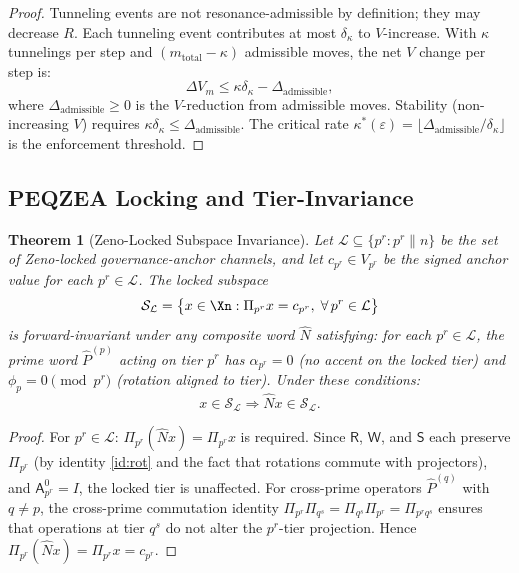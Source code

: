 \documentclass[11pt]{amsart}
\newtheorem{theorem}{Theorem}[section]
\newcommand{\Prj}{\Pi}
\newcommand{\Sp}{\mathsf{S}}
\newcommand{\Ap}{\mathsf{A}}
\newcommand{\Rp}{\mathsf{R}}
\newcommand{\Wp}{\mathsf{W}}
\newcommand{\bN}{\widehat{N}}
\begin{document}
\begin{proof}
Tunneling events are not resonance-admissible by definition; they may decrease $R$. Each tunneling event contributes at most $\delta_\kappa$ to $V$-increase. With $\kappa$ tunnelings per step and $(m_{\mathrm{total}} - \kappa)$ admissible moves, the net $V$ change per step is:
\[
  \Delta V_m \leq \kappa \delta_\kappa - \Delta_{\mathrm{admissible}},
\]
where $\Delta_{\mathrm{admissible}} \geq 0$ is the $V$-reduction from admissible moves. Stability (non-increasing $V$) requires $\kappa \delta_\kappa \leq \Delta_{\mathrm{admissible}}$. The critical rate $\kappa^*(\varepsilon) = \lfloor \Delta_{\mathrm{admissible}} / \delta_\kappa \rfloor$ is the enforcement threshold.
\end{proof}

\subsection{PEQZEA Locking and Tier-Invariance}

\begin{theorem}[Zeno-Locked Subspace Invariance]\label{thm:zeno-invariance}
Let $\mathcal{L} \subseteq \{p^r : p^r \| n\}$ be the set of Zeno-locked governance-anchor channels, and let $c_{p^r} \in V_{p^r}$ be the signed anchor value for each $p^r \in \mathcal{L}$. The locked subspace
\[
  \mathcal{S}_{\mathcal{L}} = \bigl\{x \in \Xn : \Prj_{p^r} x = c_{p^r},\; \forall\, p^r \in \mathcal{L}\bigr\}
\]
is forward-invariant under any composite word $\bN$ satisfying: for each $p^r \in \mathcal{L}$, the prime word $\hat{P}^{(p)}$ acting on tier $p^r$ has $\alpha_{p^r} = 0$ (no accent on the locked tier) and $\phi_p = 0 \pmod{p^r}$ (rotation aligned to tier). Under these conditions:
\[
  x \in \mathcal{S}_{\mathcal{L}} \Rightarrow \bN x \in \mathcal{S}_{\mathcal{L}}.
\]
\end{theorem}

\begin{proof}
For $p^r \in \mathcal{L}$: $\Prj_{p^r}(\bN x) = \Prj_{p^r} x$ is required. Since $\Rp$, $\Wp$, and $\Sp$ each preserve $\Prj_{p^r}$ (by identity \eqref{id:rot} and the fact that rotations commute with projectors), and $\Ap^0_{p^r} = I$, the locked tier is unaffected. For cross-prime operators $\hat{P}^{(q)}$ with $q \neq p$, the cross-prime commutation identity $\Prj_{p^r}\Prj_{q^s} = \Prj_{q^s}\Prj_{p^r} = \Prj_{p^r q^s}$ ensures that operations at tier $q^s$ do not alter the $p^r$-tier projection. Hence $\Prj_{p^r}(\bN x) = \Prj_{p^r} x = c_{p^r}$.
\end{proof}
\end{document}

